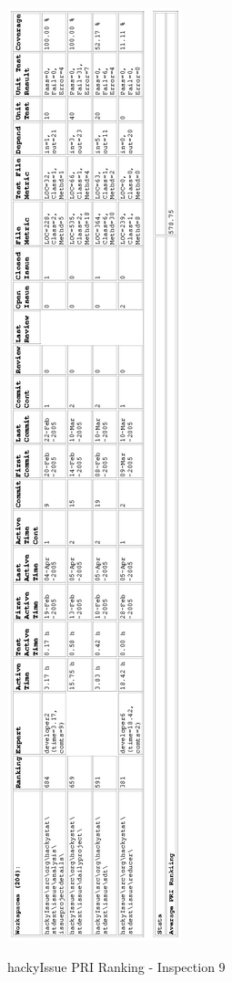 \begin{figure}[!h]
  \centering
  \caption{hackyIssue PRI Ranking - Inspection 9}
  \includegraphics[totalheight=1.0\textheight]{figs/Results/9_2005-04-10-hackyIssue-printable.eps}
  \label{fig:inspection9-hackyIssue-ranking}
\end{figure}


